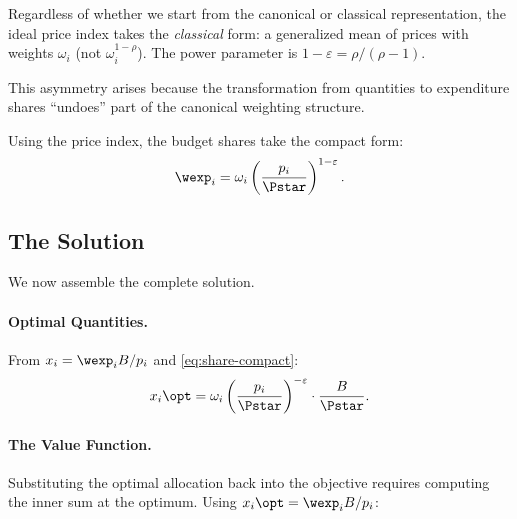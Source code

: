 \begin{calloutnote}
Regardless of whether we start from the canonical or classical representation, the ideal price index takes the \emph{classical} form: a generalized mean of prices with weights $\omega_i$ (not $\omega_i^{1-\rho}$). The power parameter is $1 - \varepsilon = \rho/(\rho-1)$.

This asymmetry arises because the transformation from quantities to expenditure shares ``undoes'' part of the canonical weighting structure.
\end{calloutnote}

Using the price index, the budget shares take the compact form:
\begin{equation}
\wexp_i = \omega_i \left(\frac{p_i}{\Pstar}\right)^{1-\varepsilon}.
\label{eq:share-compact}
\end{equation}

\subsection{The Solution}
\label{subsec:solution}

We now assemble the complete solution.

\paragraph{Optimal Quantities.}
From $x_i = \wexp_i B / p_i$ and \cref{eq:share-compact}:
\begin{equation}
x_i\opt = \omega_i \left(\frac{p_i}{\Pstar}\right)^{-\varepsilon} \cdot \frac{B}{\Pstar}.
\label{eq:optimal-x}
\end{equation}

\paragraph{The Value Function.}
Substituting the optimal allocation back into the objective requires computing the inner sum at the optimum. Using $x_i\opt = \wexp_i B / p_i$:

